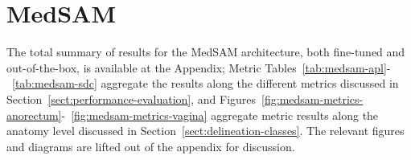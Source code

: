 \documentclass[11pt,twoside]{report}
\begin{document}





\clearpage

\section{MedSAM}

The total summary of results for the MedSAM architecture, both fine-tuned and out-of-the-box, is available at the Appendix; Metric Tables~\ref{tab:medsam-apl}-~\ref{tab:medsam-sdc} aggregate the results along the different metrics discussed in Section~\ref{sect:performance-evaluation}, and Figures~\ref{fig:medsam-metrics-anorectum}-~\ref{fig:medsam-metrics-vagina} aggregate metric results along the anatomy level discussed in Section~\ref{sect:delineation-classes}. The relevant figures and diagrams are lifted out of the appendix for discussion.
\end{document}
